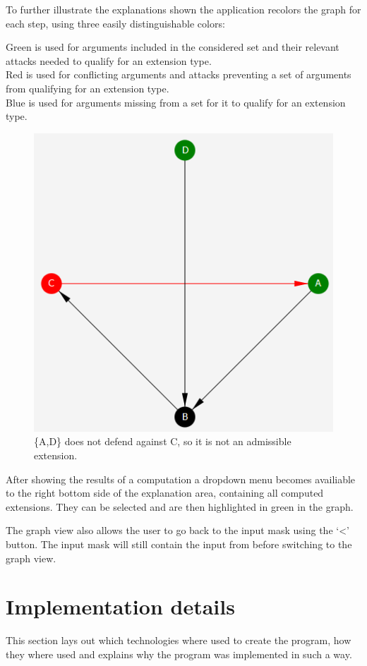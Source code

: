 \documentclass[draft,final]{vutinfth} %
\newcommand{\hl}{\par\vspace{6pt}} %
\newcommand{\cl}{\par\vspace{12pt}} %
\begin{document}
To further illustrate the explanations shown the application recolors the graph for each step, using three easily distinguishable colors:\hl
Green is used for arguments included in the considered set and their relevant attacks needed to qualify for an extension type.\\
Red is used for conflicting arguments and attacks preventing a set of arguments from qualifying for an extension type.\\
Blue is used for arguments missing from a set for it to qualify for an extension type.\hl

\FloatBarrier
	\begin{figure}[!htb]
		\centering
		\includegraphics{pics/colored.png}
		\caption{\{A,D\} does not defend against C, so it is not an admissible extension.}
	\end{figure}
\FloatBarrier

After showing the results of a computation a dropdown menu becomes availiable to the right bottom side of the explanation area, containing all computed extensions. They can be selected and are then highlighted in green in the graph.\hl
The graph view also allows the user to go back to the input mask using the `<' button. The input mask will still contain the input from before switching to the graph view.

\section{Implementation details}
This section lays out which technologies where used to create the program, how they where used and explains why the program was implemented in such a way.\cl %
\end{document}
